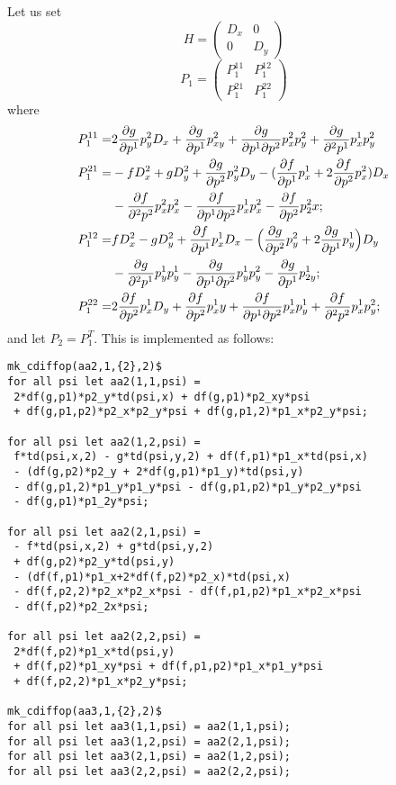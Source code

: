 Let us set
\begin{equation}
  \label{eq:19}
  H=
  \begin{pmatrix}
    D_x & 0 \\ 0 & D_y
  \end{pmatrix}
\end{equation}
\begin{equation}
  P_1=
  \begin{pmatrix}
    P_1^{11} & P_1^{12}
    \\
    P_1^{21} & P_1^{22}
  \end{pmatrix}
\end{equation}
where
\begin{align*}
  P_1^{11} = &
    2 \pd{g}{p^1} p^2_y D_x +
    \pd{g}{p^1} p^2_{xy}  + \pd{g}{p^1\partial p^2} p^2_x p^2_y  +
    \pd{g}{^2p^1} p^1_x p^2_y
    \\
   P_1^{21}=& -f D^2_x
  + g D_y^2 +
  \pd{g}{p^2} p^2_y D_y -
  (\pd{f}{p^1} p^1_x+2 \pd{f}{p^2} p^2_x) D_x
  \\ &
    - \pd{f}{^2p^2} p^2_x p^2_x  - \pd{f}{p^1\partial p^2} p^1_x p^2_x
    - \pd{f}{p^2} p^2_2x ;
  \\
P_1^{12}=&    f D_x^2 - g D_y^2
  + \pd{f}{p^1} p^1_x D_x -
  \Big(\pd{g}{p^2} p^2_y + 2 \pd{g}{p^1} p^1_y\Big) D_y
  \\
  & - \pd{g}{^2p^1} p^1_y p^1_y  - \pd{g}{p^1\partial p^2} p^1_y p^2_y
  - \pd{g}{p^1} p^1_{2y} ;
  \\
P_1^{22}=&    2 \pd{f}{p^2} p^1_x D_y
  + \pd{f}{p^2} p^1_xy  + \pd{f}{p^1\partial p^2} p^1_x p^1_y
  + \pd{f}{^2p^2} p^1_x p^2_y ;
\end{align*}
and let $P_2 = P_1^T$. This is implemented as follows:
\begin{verbatim}
mk_cdiffop(aa2,1,{2},2)$
for all psi let aa2(1,1,psi) =
 2*df(g,p1)*p2_y*td(psi,x) + df(g,p1)*p2_xy*psi
 + df(g,p1,p2)*p2_x*p2_y*psi + df(g,p1,2)*p1_x*p2_y*psi;

for all psi let aa2(1,2,psi) =
 f*td(psi,x,2) - g*td(psi,y,2) + df(f,p1)*p1_x*td(psi,x)
 - (df(g,p2)*p2_y + 2*df(g,p1)*p1_y)*td(psi,y)
 - df(g,p1,2)*p1_y*p1_y*psi - df(g,p1,p2)*p1_y*p2_y*psi
 - df(g,p1)*p1_2y*psi;

for all psi let aa2(2,1,psi) =
 - f*td(psi,x,2) + g*td(psi,y,2)
 + df(g,p2)*p2_y*td(psi,y)
 - (df(f,p1)*p1_x+2*df(f,p2)*p2_x)*td(psi,x)
 - df(f,p2,2)*p2_x*p2_x*psi - df(f,p1,p2)*p1_x*p2_x*psi
 - df(f,p2)*p2_2x*psi;

for all psi let aa2(2,2,psi) =
 2*df(f,p2)*p1_x*td(psi,y)
 + df(f,p2)*p1_xy*psi + df(f,p1,p2)*p1_x*p1_y*psi
 + df(f,p2,2)*p1_x*p2_y*psi;

mk_cdiffop(aa3,1,{2},2)$
for all psi let aa3(1,1,psi) = aa2(1,1,psi);
for all psi let aa3(1,2,psi) = aa2(2,1,psi);
for all psi let aa3(2,1,psi) = aa2(1,2,psi);
for all psi let aa3(2,2,psi) = aa2(2,2,psi);
\end{verbatim}

